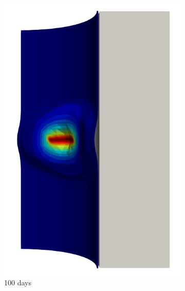 \begin{figure}[!htb]
\begin{subfigure}[b]{0.2\textwidth}
    \includegraphics[width=\textwidth]{Chapter5/figures/spallation/seed_d_3}
    \caption{100 days}
  \end{subfigure}
  \begin{subfigure}[b]{0.2\textwidth}
    \centering

\end{subfigure}
\end{figure}
